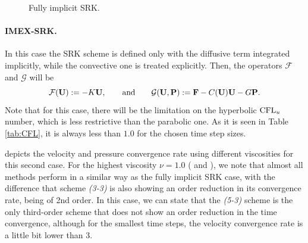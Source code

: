 \begin{figure}[h!]
  \caption{Fully implicit SRK.}
  \label{fig-IMEX_implcnv_RK_analytical}
\end{figure}

\paragraph{IMEX-SRK.}

In this case the SRK scheme is defined only with the diffusive term integrated implicitly, while the convective one is treated explicitly. Then, the operators $\mathcal{F}$ and $\mathcal{G}$ will be
$$\mathcal{F}({\bf U}):=-K{\bf U},\quad\quad\mbox{and}\quad\quad\mathcal{G}({\bf U},{\bf P}):={\bf F}-C({\bf U}){\bf U}-G{\bf P}.$$
Note that for this case, there will be the limitation on the hyperbolic ${\rm CFL}_u$ number, which is less restrictive than the parabolic one. As it is seen in Table \ref{tab:CFL}, it is always less than $1.0$ for the chosen time step sizes.

 depicts the velocity and pressure convergence rate using different viscosities for this second case. 
For the highest viscosity $\nu=1.0$ ( and ), we note that almost all methods perform in a similar way as the fully implicit SRK case, with the difference that scheme \textit{(3-3)} is also showing an order reduction in its convergence rate, being of 2nd order. In this case, we can state that the \textit{(5-3)} scheme is the only third-order scheme that does not show an order reduction in the time convergence, although for the smallest time steps, the velocity convergence rate is a little bit lower than 3.

